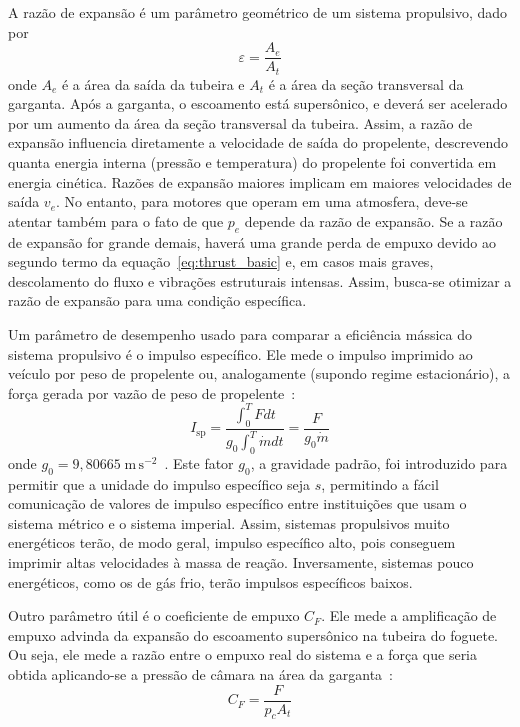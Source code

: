 A razão de expansão é um parâmetro geométrico de um sistema propulsivo, dado por
\begin{equation}
    \label{eq:exp_ratio}
    \varepsilon = \frac{A_e}{A_t}
\end{equation}
onde \(A_e\) é a área da saída da tubeira e \(A_t\) é a área da seção transversal da garganta. Após a garganta, o escoamento está supersônico, e deverá ser acelerado por um aumento da área da seção transversal da tubeira. Assim, a razão de expansão influencia diretamente a velocidade de saída do propelente, descrevendo quanta energia interna (pressão e temperatura) do propelente foi convertida em energia cinética. Razões de expansão maiores implicam em maiores velocidades de saída \(v_e\). No entanto, para motores que operam em uma atmosfera, deve-se atentar também para o fato de que \(p_e\) depende da razão de expansão. Se a razão de expansão for grande demais, haverá uma grande perda de empuxo devido ao segundo termo da equação~\ref{eq:thrust_basic} e, em casos mais graves, descolamento do fluxo e vibrações estruturais intensas. Assim, busca-se otimizar a razão de expansão para uma condição específica.

Um parâmetro de desempenho usado para comparar a eficiência mássica do sistema propulsivo é o impulso específico. Ele mede o impulso imprimido ao veículo por peso de propelente ou, analogamente (supondo regime estacionário), a força gerada por vazão de peso de propelente~\cite{Sutton}:
\begin{equation}
    \label{eq:Isp}
    I_{\text{sp}} = \frac{\int^T_0 F dt}{g_0 \int^T_0 \dot{m}dt} = \frac{F}{g_0 \dot{m}}
\end{equation}
onde \(g_0=9,80665\;\mathrm{m}\,\mathrm{s}^{-2}\)~\cite{CGPM}. Este fator \(g_0\), a gravidade padrão, foi introduzido para permitir que a unidade do impulso específico seja \(s\), permitindo a fácil comunicação de valores de impulso específico entre instituições que usam o sistema métrico e o sistema imperial. Assim, sistemas propulsivos muito energéticos terão, de modo geral, impulso específico alto, pois conseguem imprimir altas velocidades à massa de reação. Inversamente, sistemas pouco energéticos, como os de gás frio, terão impulsos específicos baixos.

Outro parâmetro útil é o coeficiente de empuxo \(C_F\). Ele mede a amplificação de empuxo advinda da expansão do escoamento supersônico na tubeira do foguete. Ou seja, ele mede a razão entre o empuxo real do sistema e a força que seria obtida aplicando-se a pressão de câmara na área da garganta~\cite{Sutton}:
\begin{equation}
    \label{eq:C_F}
    C_F = \frac{F}{p_c A_t}
\end{equation}

